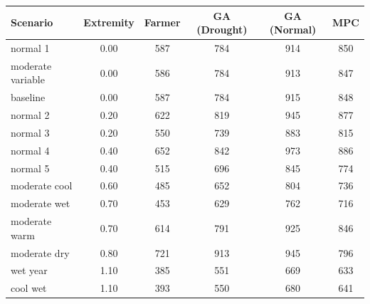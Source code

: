 \documentclass[pdflatex,sn-mathphys-num]{sn-jnl}
\begin{document}

\begin{table}[ht]
\centering
\small
\begin{tabular}{|l|c|c|c|c|c|}
\hline
Scenario & Extremity & Farmer & GA (Drought) & GA (Normal) & MPC \\
\hline\hline
normal 1             & 0.00 & \cellcolor{c2}587 & \cellcolor{c4}784 & \cellcolor{c6}914 & \cellcolor{c5}850 \\
moderate variable    & 0.00 & \cellcolor{c2}586 & \cellcolor{c4}784 & \cellcolor{c6}913 & \cellcolor{c5}847 \\
baseline             & 0.00 & \cellcolor{c2}587 & \cellcolor{c4}784 & \cellcolor{c6}915 & \cellcolor{c5}848 \\
normal 2             & 0.20 & \cellcolor{c3}622 & \cellcolor{c5}819 & \cellcolor{c6}945 & \cellcolor{c5}877 \\
normal 3             & 0.20 & \cellcolor{c2}550 & \cellcolor{c4}739 & \cellcolor{c5}883 & \cellcolor{c5}815 \\
normal 4             & 0.40 & \cellcolor{c3}652 & \cellcolor{c5}842 & \cellcolor{c6}973 & \cellcolor{c5}886 \\
normal 5             & 0.40 & \cellcolor{c2}515 & \cellcolor{c3}696 & \cellcolor{c5}845 & \cellcolor{c4}774 \\
moderate cool        & 0.60 & \cellcolor{c1}485 & \cellcolor{c3}652 & \cellcolor{c5}804 & \cellcolor{c4}736 \\
moderate wet         & 0.70 & \cellcolor{c1}453 & \cellcolor{c3}629 & \cellcolor{c4}762 & \cellcolor{c4}716 \\
moderate warm        & 0.70 & \cellcolor{c3}614 & \cellcolor{c4}791 & \cellcolor{c6}925 & \cellcolor{c5}846 \\
moderate dry         & 0.80 & \cellcolor{c4}721 & \cellcolor{c6}913 & \cellcolor{c6}945 & \cellcolor{c4}796 \\
wet year             & 1.10 & \cellcolor{c1}385 & \cellcolor{c2}551 & \cellcolor{c3}669 & \cellcolor{c3}633 \\
cool wet             & 1.10 & \cellcolor{c1}393 & \cellcolor{c2}550 & \cellcolor{c3}680 & \cellcolor{c3}641 \\

\end{tabular}
\end{table}
\end{document}
